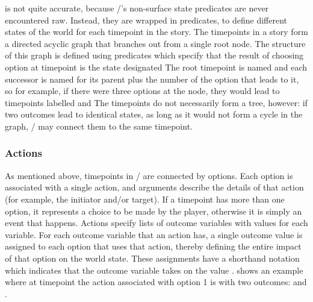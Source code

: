  is not quite accurate, because \dunyazad/'s non-surface state predicates are never encountered raw.
%
Instead, they are wrapped in  predicates, to define different states of the world for each timepoint in the story.
%
The timepoints in a story form a directed acyclic graph that branches out from a single root node.
%
The structure of this graph is defined using  predicates which specify that the result of choosing option  at timepoint  is the state designated 
%
The root timepoint is named  and each successor is named for its parent plus the number of the option that leads to it, so for example, if there were three options at the  node, they would lead to timepoints labelled   and 
%
The timepoints do not necessarily form a tree, however: if two outcomes lead to identical states, as long as it would not form a cycle in the graph, \dunyazad/ may connect them to the same timepoint.


\subsubsection{Actions}

As mentioned above, timepoints in \dunyazad/ are connected by options.
%
Each option is associated with a single action, and arguments describe the details of that action (for example, the initiator and/or target).
%
If a timepoint has more than one option, it represents a choice to be made by the player, otherwise it is simply an event that happens.
%
Actions specify lists of outcome variables with values for each variable.
%
For each outcome variable that an action has, a single outcome value is assigned to each option that uses that action, thereby defining the entire impact of that option on the world state.
%
These assignments have a shorthand notation  which indicates that the outcome variable  takes on the value .
%
 shows an example where at timepoint  the action associated with option 1 is  with two outcomes:  and .

